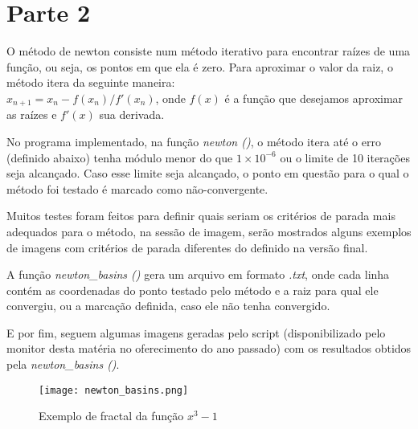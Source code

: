 \documentclass{article}
\begin{document}
\begin{flushleft}

\end{flushleft}

\section*{Parte 2}
O método de newton consiste num método iterativo para encontrar raízes de uma função, ou seja,
os pontos em que ela é zero. Para aproximar o valor da raiz, o método itera da seguinte maneira: \\
$x_{n+1} = x_{n} - f(x_{n})/f'(x_{n})$, onde $f(x)$ é a função que desejamos aproximar as
raízes e $f'(x)$ sua derivada.

No programa implementado, na função \textit{newton ()}, o método itera até o erro (definido abaixo) 
tenha módulo menor do que $1 \times 10^{-6}$ ou o limite de 10 iterações seja alcançado. Caso esse limite seja alcançado,
o ponto em questão para o qual o método foi testado é marcado como não-convergente.

Muitos testes foram feitos para definir quais seriam os critérios de parada mais adequados para o método,
na sessão de imagem, serão mostrados alguns exemplos de imagens com critérios de parada diferentes do definido na versão final. 

A função \textit{newton\_basins ()} gera um arquivo em formato \textit{.txt}, onde cada linha contém as coordenadas 
do ponto testado pelo método e a raiz para qual ele convergiu, ou a marcação definida, caso ele não tenha
convergido.


E por fim, seguem algumas imagens geradas pelo script (disponibilizado pelo
monitor desta matéria no oferecimento do ano passado) com os resultados obtidos
pela \textit{newton\_basins ()}.


\begin{figure}[h]
\caption{Exemplo de fractal da função $x^{3} - 1$}
\centering
\texttt{[image: newton\_basins.png]}
\end{figure}





\end{document}
